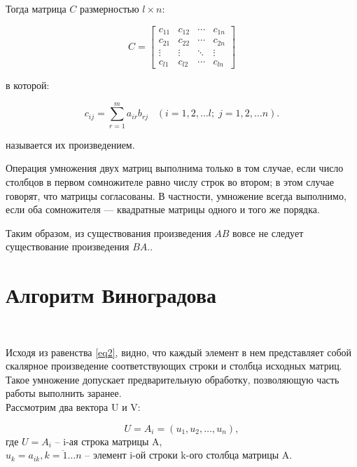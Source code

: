 \documentclass[12pt]{report}
\begin{document}
	Тогда матрица ${\displaystyle C}$ размерностью ${\displaystyle l\times n}$:
	
	\begin{equation} \label{eq2}
	C={
		\begin{bmatrix}
		c_{11} & c_{12} & \cdots & c_{1n} \\
		c_{21} & c_{22} & \cdots & c_{2n} \\
		\vdots & \vdots & \ddots & \vdots \\
		c_{l1} & c_{l2} & \cdots & c_{ln}
		\end{bmatrix}
	}
	\end{equation}
	
	в которой:
	
	\begin{equation} \label{eq3}
	{\displaystyle c_{ij}=
		\sum _{r=1}^{m}a_{ir}b_{rj}\;\;\;\left(i=1,2,\ldots l;\;j=1,2,\ldots n\right).}
	\end{equation}
	
	называется их произведением.
	
	Операция умножения двух матриц выполнима только в том случае, если число столбцов в первом сомножителе равно числу строк во втором; в этом случае говорят, что матрицы согласованы. В частности, умножение всегда выполнимо, если оба сомножителя — квадратные матрицы одного и того же порядка.
	
	Таким образом, из существования произведения ${\displaystyle AB}$ вовсе не следует существование произведения ${\displaystyle BA.}$.
	
	\section{Алгоритм Виноградова}
	
	~\
	
	Исходя из равенства \ref{eq2}, видно, что каждый элемент в нем представляет собой скалярное произведение соответствующих строки и столбца исходных матриц. Такое умножение допускает предварительную обработку, позволяющую часть работы выполнить заранее. ~\cite{Winograd}\\
	Рассмотрим два вектора U и V:
	
	\begin{equation}
	\label{u-def}
	U = A_{i} = (u_{1}, u_{2}, \ldots, u_{n}),
	\end{equation}
	где $U = A_{i}$ -- i-ая строка матрицы A,\\
	$u_{k} = a_{ik}, \overline{k = 1 \ldots n}$ -- элемент i-ой строки k-ого столбца матрицы A.\\
	
\end{document}
